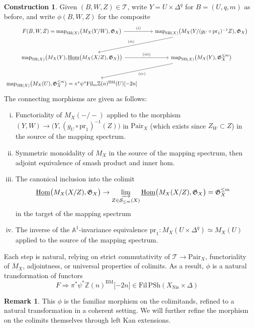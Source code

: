 \documentclass[11pt, twoside]{article}
\numberwithin{equation}{section}
\theoremstyle{definition}
\newtheorem{construction}[equation]{Construction}
\newtheorem{remark}[equation]{Remark}
\newcommand{\bb}[1]{\mathbb{#1}}
\newcommand{\Hom}{\mathrm{Hom}}
\newcommand{\colim}{\varinjlim}
\newcommand{\mf}[1]{\mathfrak{#1}}
\newcommand{\pr}{\mathrm{pr}}
\newcommand{\map}{\mathrm{map}}
\newcommand{\fil}{\mathrm{Fil}}
\newcommand{\sh}{\mathrm{SH}}
\newcommand{\bm}{\mathrm{BM}}
\newcommand{\psh}{\mathrm{PSh}}
\newcommand{\nis}{\mathrm{Nis}}
\begin{document}
\begin{construction}\label{con:phi}
Given \((B, W, Z) \in \mathcal{T}\), write \(Y = U \times \Delta^q\) for \(B = (U, q, m)\) as before, and write \(\phi(B, W, Z)\) for the composite 
\[\begin{tikzcd} [row sep = large]
F(B, W, Z) = \map_{\sh(X)}\big(M_X(Y/W), \mf{G}_X\big) \ar[r, "(i)"] & \map_{\sh(X)}\big(M_X(Y/(g_U \circ \pr_1)^{- 1}Z), \mf{G}_X\big) \ar[dl, "(ii)", swap]\\ \map_{\sh(X)}\big(M_X(Y), \underline{\Hom}\big(M_X(X/Z), \mf{G}_X\big)\big) \ar[r, "(iii)"] & \map_{\sh(X)}\big(M_X(Y), \mf{G}_X^{\leq m}\big) \ar[dl, "(iv)"]\\
\map_{\sh(X)}\big(M_X(U), \mf{G}_X^{\leq m}\big) = \pi^* \psi^* \fil_m \bb{Z}(n)^\bm(U) \lbrack -2n \rbrack
\end{tikzcd}\]
The connecting morphisms are given as follows:
\begin{enumerate}[(i)]

\item Functoriality of \(M_X( -/-)\) applied to the morphism \((Y, W) \to \big(Y, (g_U \circ \pr_1)^{- 1}(Z)\big)\) in \(\mathrm{Pair}_X\) (which exists since \(Z_W \subset Z\)) in the source of the mapping spectrum.

\item Symmetric monoidality of \(M_X\) in the source of the mapping spectrum, then adjoint equivalence of smash product and inner hom.

\item The canonical inclusion into the colimit 
\[\underline{\Hom}\big(M_X(X/Z), \mf{G}_X\big) \to \colim_{Z \in \mathcal{S}_{\leq m}(X)} \underline{\Hom}\big(M_X(X/Z), \mf{G}_X\big) = \mf{G}_X^{\leq m}\]
in the target of the mapping spectrum

\item The inverse of the \(\bb{A}^1\)-invariance equivalence \(\pr_1 \colon M_X(U \times \Delta^q) \simeq M_X(U)\) applied to the source of the mapping spectrum.
\end{enumerate}
Each step is natural, relying on strict commutativity of \(\mathcal{T} \to \mathrm{Pair}_X\), functoriality of \(M_X\), adjointness, or universal properties of colimits. 
As a result, \(\phi\) is a natural transformation of functors 
\[F \Longrightarrow \pi^* \psi^* \bb{Z}(n)^\bm \lbrack -2n \rbrack \in \fil \, \psh(X_\nis \times \Delta)\]
\end{construction}

\begin{remark}
This \(\phi\) is the familiar morphism on the colimitands, refined to a natural transformation in a coherent setting. We will further refine the morphism on the colimits themselves through left Kan extensions.
\end{remark}
\end{document}
